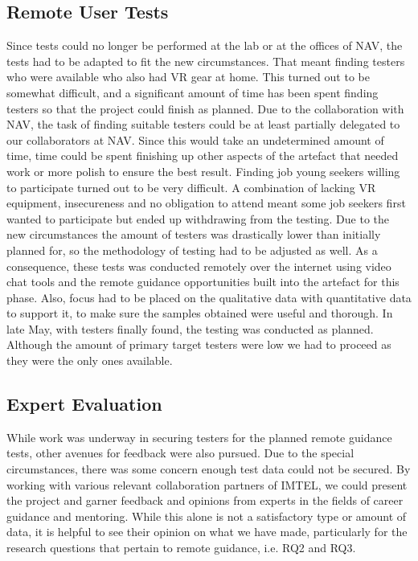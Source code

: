 \subsection{Remote User Tests}
Since tests could no longer be performed at the lab or at the offices of NAV, the tests had to be adapted to fit the new circumstances. That meant finding testers who were available who also had VR gear at home. This turned out to be somewhat difficult, and a significant amount of time has been spent finding testers so that the project could finish as planned. Due to the collaboration with NAV, the task of finding suitable testers could be at least partially delegated to our collaborators at NAV. Since this would take an undetermined amount of time, time could be spent finishing up other aspects of the artefact that needed work or more polish to ensure the best result.
Finding job young seekers willing to participate turned out to be very difficult. A combination of lacking VR equipment, insecureness and no obligation to attend meant some job seekers first wanted to participate but ended up withdrawing from the testing. Due to the new circumstances the amount of testers was drastically lower than initially planned for, so the methodology of testing had to be adjusted as well. As a consequence, these tests was conducted remotely over the internet using video chat tools and the remote guidance opportunities built into the artefact for this phase. Also, focus had to be placed on the qualitative data with quantitative data to support it, to make sure the samples obtained were useful and thorough. In late May, with testers finally found, the testing was conducted as planned. Although the amount of primary target testers were low we had to proceed as they were the only ones available.   



\subsection{Expert Evaluation}
\label{section:phase3_expertEval}
While work was underway in securing testers for the planned remote guidance tests, other avenues for feedback were also pursued. Due to the special circumstances, there was some concern enough test data could not be secured. By working with various relevant collaboration partners of IMTEL, we could present the project and garner feedback and opinions from experts in the fields of career guidance and mentoring. While this alone is not a satisfactory type or amount of data, it is helpful to see their opinion on what we have made, particularly for the research questions that pertain to remote guidance, i.e. RQ2 and RQ3.

